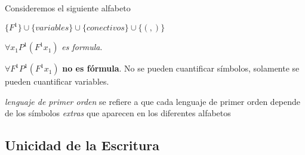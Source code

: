 \begin{example} Consideremos el siguiente alfabeto
	
	$\{F^1\} \cup \{ variables \} \cup \{ conectivos\} \cup \{ (, )\}$
	
	$\forall x_1 P^1 (F^1 x_1)$ \textit{es formula}.
	
	$\forall F^1 P^1 (F^1 x_1)$ \textbf{no es f\'ormula}. No se pueden cuantificar s\'imbolos, 			solamente se pueden cuantificar variables.		 
	\item \textit{lenguaje de primer orden} se refiere a que cada lenguaje de primer orden 			depende de los s\'imbolos \textit{extras} que aparecen en los diferentes alfabetos 		

\end{example}

\subsection{Unicidad de la Escritura}

